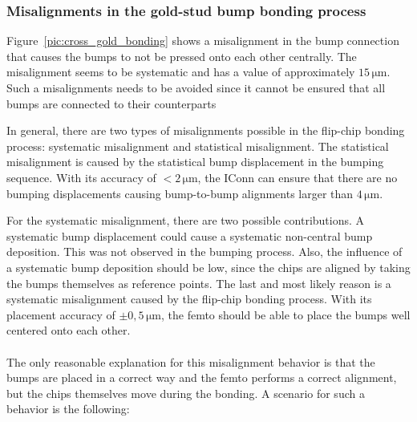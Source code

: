 \subsubsection{Misalignments in the gold-stud bump bonding process}\label{sec:bonding_misalignment}
Figure~\ref{pic:cross_gold_bonding} shows a misalignment in the bump connection that causes the bumps to not be pressed onto each other centrally. The misalignment seems to be systematic and has a value of approximately $15\,\si{\micro \meter}$. Such a misalignments needs to be avoided since it cannot be ensured that all bumps are connected to their counterparts

In general, there are two types of misalignments possible in the flip-chip bonding process: systematic misalignment and statistical misalignment. The statistical misalignment is caused by the statistical bump displacement in the bumping sequence. With its accuracy of $<2\,\si{\micro \meter}$, the IConn can ensure that there are no bumping displacements causing bump-to-bump alignments larger than $4\,\si{\micro \meter}$.

For the systematic misalignment, there are two possible contributions. A systematic bump displacement could cause a systematic non-central bump deposition. This was not observed in the bumping process. Also, the influence of a systematic bump deposition should be low, since the chips are aligned by taking the bumps themselves as reference points. The last and most likely reason is a systematic misalignment caused by the flip-chip bonding process. With its placement accuracy of $\pm 0,5\,\si{\micro \meter}$, the femto should be able to place the bumps well centered onto each other.
\\
\\The only reasonable explanation for this misalignment behavior is that the bumps are placed in a correct way and the femto performs a correct alignment, but the chips themselves move during the bonding. A scenario for such a behavior is the following:

